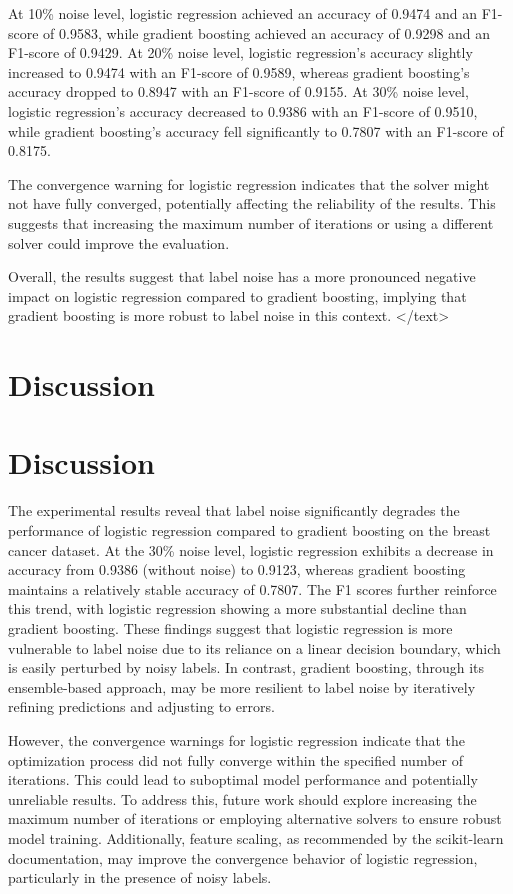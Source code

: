 \documentclass{article}
\begin{document}
At 10\% noise level, logistic regression achieved an accuracy of 0.9474 and an F1-score of 0.9583, while gradient boosting achieved an accuracy of 0.9298 and an F1-score of 0.9429. At 20\% noise level, logistic regression's accuracy slightly increased to 0.9474 with an F1-score of 0.9589, whereas gradient boosting's accuracy dropped to 0.8947 with an F1-score of 0.9155. At 30\% noise level, logistic regression's accuracy decreased to 0.9386 with an F1-score of 0.9510, while gradient boosting's accuracy fell significantly to 0.7807 with an F1-score of 0.8175.

The convergence warning for logistic regression indicates that the solver might not have fully converged, potentially affecting the reliability of the results. This suggests that increasing the maximum number of iterations or using a different solver could improve the evaluation.

Overall, the results suggest that label noise has a more pronounced negative impact on logistic regression compared to gradient boosting, implying that gradient boosting is more robust to label noise in this context.
</text>
\section{Discussion}
\section{Discussion}

The experimental results reveal that label noise significantly degrades the performance of logistic regression compared to gradient boosting on the breast cancer dataset. At the 30\% noise level, logistic regression exhibits a decrease in accuracy from 0.9386 (without noise) to 0.9123, whereas gradient boosting maintains a relatively stable accuracy of 0.7807. The F1 scores further reinforce this trend, with logistic regression showing a more substantial decline than gradient boosting. These findings suggest that logistic regression is more vulnerable to label noise due to its reliance on a linear decision boundary, which is easily perturbed by noisy labels. In contrast, gradient boosting, through its ensemble-based approach, may be more resilient to label noise by iteratively refining predictions and adjusting to errors.

However, the convergence warnings for logistic regression indicate that the optimization process did not fully converge within the specified number of iterations. This could lead to suboptimal model performance and potentially unreliable results. To address this, future work should explore increasing the maximum number of iterations or employing alternative solvers to ensure robust model training. Additionally, feature scaling, as recommended by the scikit-learn documentation, may improve the convergence behavior of logistic regression, particularly in the presence of noisy labels.
\end{document}
